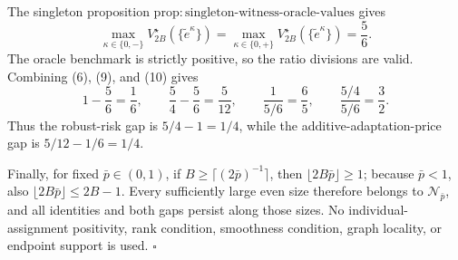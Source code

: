 The singleton proposition \(\mathrm{prop{:}singleton\text{-}witness\text{-}oracle\text{-}values}\) gives
\[
 \max_{\kappa\in\{0,-\}}V_{2B}^\star(\{\widetilde e^\kappa\})
 =\max_{\kappa\in\{0,+\}}V_{2B}^\star(\{\widetilde e^\kappa\})
 =\frac56. \tag{10}
\]
The oracle benchmark is strictly positive, so the ratio divisions are valid.  Combining (6), (9), and (10) gives
\[
 1-\frac56=\frac16,
 \qquad
 \frac54-\frac56=\frac5{12},
 \qquad
 \frac{1}{5/6}=\frac65,
 \qquad
 \frac{5/4}{5/6}=\frac32. \tag{11}
\]
Thus the robust-risk gap is \(5/4-1=1/4\), while the additive-adaptation-price gap is \(5/12-1/6=1/4\).

Finally, for fixed \(\bar p\in(0,1)\), if \(B\ge\lceil(2\bar p)^{-1}\rceil\), then \(\lfloor2B\bar p\rfloor\ge1\); because \(\bar p<1\), also \(\lfloor2B\bar p\rfloor\le2B-1\).  Every sufficiently large even size therefore belongs to \(\mathcal N_{\bar p}\), and all identities and both gaps persist along those sizes.  No individual-assignment positivity, rank condition, smoothness condition, graph locality, or endpoint support is used. \(\square\)